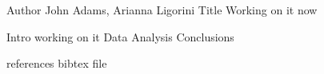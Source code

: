 Author John Adams, Arianna Ligorini 
Title Working on it now 

Intro working on it
Data
Analysis
Conclusions


references
bibtex file

